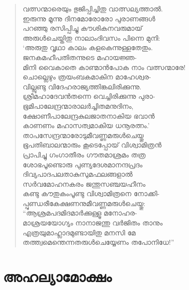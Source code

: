 \begin{verse}
വത്സന്മാരെയും ഭുജിപ്പിച്ചിതു വാത്സല്യത്താല്‍.\\
ഇരുന്നു മൂന്നു ദിനമോരോരോ പുരാണങ്ങള്‍\\
പറഞ്ഞു രസിപ്പിച്ചു കൗശികനവരുമായ്\\
അരുള്‍ചെയ്തിതു നാലാംദിവസം പിന്നെ മുനി:\\
‘അരുതു വൃഥാ കാലം കളകെന്നുള്ളതേതും.\\
ജനകമഹീപതിതന്നുടെ മഹായജ്ഞ-\\
മിനി വൈകാതെ കാണ്മാന്‍പോക നാം വത്സന്മാരേ!\\
ചൊല്ലെഴും ത്രയംബകമാകിന മാഹേശ്വര-\\
വില്ലുണ്ടു വിദേഹരാജ്യത്തിങ്കലിരിക്കുന്നു.\\
ശ്രീമഹാദേവന്‍തന്നെ വെച്ചിരിക്കുന്നു പുരാ-\\
ഭൂമിപാലേന്ദ്രന്മാരാലര്‍ച്ചിതമനുദിനം,\\
ക്ഷോണീപാലേന്ദ്രകുലജാതനാകിയ ഭവാന്‍\\
കാണണം മഹാസത്വമാകിയ ധനൂരത്നം.’\\
താപസേന്ദ്രന്മാരോടുമീവണ്ണമരുള്‍ചെയ്തു\\
ഭൂപതിബാലന്മാരും കൂടെപ്പോയ് വിശ്വാമിത്രന്‍\\
പ്രാപിച്ചു ഗംഗാതീരം ഗൗതമാശ്രമം തത്ര\\
ശോഭപൂണ്ടൊരു പുണ്യദേശമാനന്ദപ്രദം\\
ദിവ്യപാദപലതാകുസുമഫലങ്ങളാല്‍\\
സര്‍വമോഹനകരം ജന്തുസഞ്ചയഹീനം\\
കണ്ടു കൗതുകംപൂണ്ടു വിശ്വാമിത്രനെ നോക്കി-\\
പ്പുണ്ഡരീകേക്ഷണനുമീവണ്ണമരുള്‍ചെയ്തു:\\
“ആശ്രമപദമിദമാര്‍ക്കുള്ളൂ മനോഹര-\\
മാശ്രയയോഗ്യം നാനാജന്തു വര്‍ജിതം താനും\\
എത്രയുമാഹ്ലാദമുണ്ടായിതു മനസി മേ\\
തത്ത്വമെന്തെന്നതരുള്‍ചെയ്യേണം തപോനിധേ!”
\end{verse}


\section{അഹല്യാമോക്ഷം}

